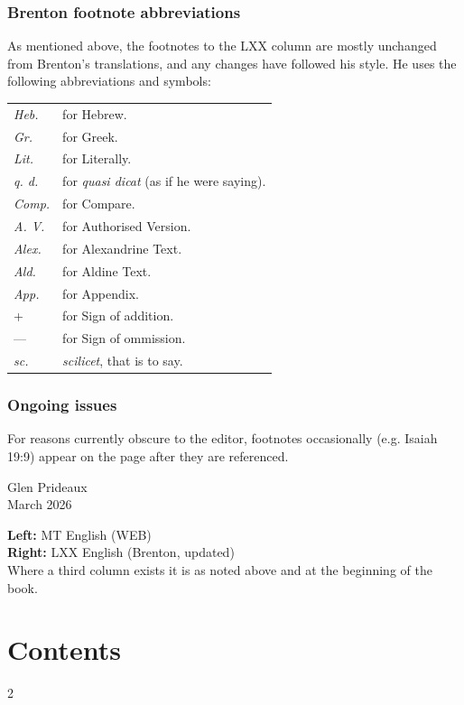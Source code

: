 {{\subsection*{Brenton footnote abbreviations}
As mentioned above, the footnotes to the LXX column are mostly unchanged from Brenton's translations, and any changes have followed his style. He uses the following abbreviations and symbols:\par
\begin{tabular}{ll}
  \textit{Heb.}&for Hebrew.\\
  \textit{Gr.}&for Greek. \\
  \textit{Lit.}&for Literally. \\
  \textit{q. d.}&for \textit{quasi dicat} (as if he were saying).\\
  \textit{Comp.}&for Compare. \\
  \textit{A. V.}&for Authorised Version. \\
  \textit{Alex.}&for Alexandrine Text. \\
  \textit{Ald.}&for Aldine Text.\\
  \textit{App.}&for Appendix. \\
  +&for Sign of addition. \\
  —&for Sign of ommission. \\
  \textit{sc.}&\textit{scilicet}, that is to say.
\end{tabular}\par
}

\subsection*{Ongoing issues}
For reasons currently obscure to the editor, footnotes occasionally (e.g. Isaiah 19:9) appear on the page after they are referenced.

\bigskip
\noindent Glen Prideaux\\
March 2026

\bigskip
\noindent\textbf{Left:} MT English (WEB)\\
\textbf{Right:} LXX English (Brenton, updated)\\
Where a third column exists it is as noted above and at the beginning of the book.

\cleardoublepage
\chapter*{Contents}
\begin{multicols}{2}
\TOCwithouttitle
\end{multicols}
}
